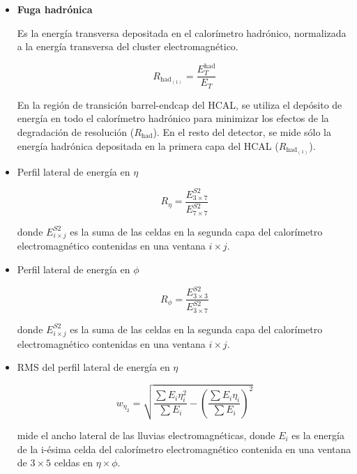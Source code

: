 \begin{itemize}

	\item \textbf{Fuga hadrónica}

		Es la energía transversa depositada en el calorímetro hadrónico, normalizada a la energía transversa del cluster electromagnético.

		\begin{equation}
		R_{\text{had}_{(1)}}=\frac{E_{T}^{\text{had}}}{E_{T}}
		\end{equation}

		En la región de transición barrel-endcap del HCAL, se utiliza el depósito de energía en todo el calorímetro hadrónico para minimizar los efectos de la degradación de resolución ($R_{\text{had}}$). En el resto del detector, se mide sólo la energía hadrónica depositada en la primera capa del HCAL ($R_{\text{had}_{(1)}}$).

	\item  Perfil lateral de energía en $\eta$

		\begin{equation}
		R_{\eta}=\frac{E_{3\times 7}^{S2}}{E_{7\times 7}^{S2}}
		\end{equation}

 		donde $E_{i\times j}^{S2}$ es la suma de las celdas en la segunda capa del calorímetro electromagnético contenidas en una ventana $i\times j$.

	\item  Perfil lateral de energía en $\phi$

		\begin{equation}
		R_{\phi}=\frac{E_{3\times 3}^{S2}}{E_{3\times 7}^{S2}}
		\end{equation}

 		donde $E_{i\times j}^{S2}$ es la suma de las celdas en la segunda capa del calorímetro electromagnético contenidas en una ventana $i\times j$.

	\item  RMS del perfil lateral de energía en $\eta$


		\begin{equation}
		w_{\eta_{2}}=\sqrt{\frac{\sum E_{i}\eta_{i}^{2}}{\sum E_{i}}- \left(\frac{\sum E_{i}\eta_{i}}{\sum E_{i}}\right)^{2}}
		\end{equation}

		mide el ancho lateral de las lluvias electromagnéticas, donde $E_{i}$ es la energía de la i-ésima celda del calorímetro electromagnético contenida en una ventana de $3\times 5$ celdas en $\eta \times \phi$.


\end{itemize}
